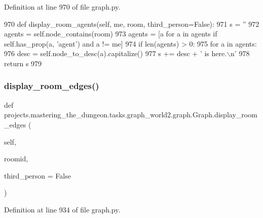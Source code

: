 Definition at line 970 of file graph.\+py.


\begin{DoxyCode}
970     \textcolor{keyword}{def }display\_room\_agents(self, me, room, third\_person=False):
971         s = \textcolor{stringliteral}{''}
972         agents = self.node\_contains(room)
973         agents = [a \textcolor{keywordflow}{for} a \textcolor{keywordflow}{in} agents \textcolor{keywordflow}{if} self.has\_prop(a, \textcolor{stringliteral}{'agent'}) \textcolor{keywordflow}{and} a != me]
974         \textcolor{keywordflow}{if} len(agents) > 0:
975             \textcolor{keywordflow}{for} a \textcolor{keywordflow}{in} agents:
976                 desc = self.node\_to\_desc(a).capitalize()
977                 s += desc + \textcolor{stringliteral}{' is here.\(\backslash\)n'}
978         \textcolor{keywordflow}{return} s
979 
\end{DoxyCode}
\mbox{\label{classprojects_1_1mastering__the__dungeon_1_1tasks_1_1graph__world2_1_1graph_1_1Graph_a0e754e04d1c69f6531f0f7e18ba7f35a}} 
\subsubsection{\texorpdfstring{display\+\_\+room\+\_\+edges()}{display\_room\_edges()}}
{\footnotesize\ttfamily def projects.\+mastering\+\_\+the\+\_\+dungeon.\+tasks.\+graph\+\_\+world2.\+graph.\+Graph.\+display\+\_\+room\+\_\+edges (\begin{DoxyParamCaption}\item[{}]{self,  }\item[{}]{roomid,  }\item[{}]{third\+\_\+person = {\ttfamily False} }\end{DoxyParamCaption})}



Definition at line 934 of file graph.\+py.


